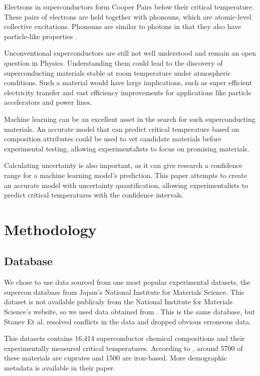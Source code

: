 \documentclass[twocolumn, nofootinbib, secnumarabic, amssymb, nobibnotes, aps, prd]{revtex4-2}
\begin{document}
Electrons in superconductors form Cooper Pairs below their critical temperature. These pairs of electrons are held together with phonouns, which are atomic-level collective excitations. Phonouns are similar to photons in that they also have particle-like properties \cite{rohlf_1994, BussmannHolderKeller2020}.

Unconventional superconductors are still not well understood and remain an open question in Physics. Understanding them could lead to the discovery of superconducting materials stable at room temperature under atmospheric conditions. Such a material would have large implications, such as super efficient electricity transfer and vast efficiency improvements for applications like particle accelerators and power lines.

Machine learning can be an excellent asset in the search for such superconducting materials. An accurate model that can predict critical temperature based on composition attributes could be used to vet candidate materials before experimental testing, allowing experimentalists to focus on promising materials. 

Calculating uncertainty is also important, as it can give research a confidence range for a machine learning model's prediction. This paper attempts to create an accurate model with uncertainty quantification, allowing experimentalists to predict critical temperatures with the confidence intervals.

\section{Methodology}
\subsection{Database}
We chose to use data sourced from one most popular experimental datasets, the supercon database from Japan's National Institute for Materials Science. This dataset is not available publicaly from the National Institute for Materials Science's website, so we used data obtained from \cite{Stanev2018}. This is the same database, but Stanev Et al. resolved conflicts in the data and dropped obvious erroneous data.

This datasets contains 16,414 superconductor chemical compositions and their experimentally measured critical temperatures. According to \cite{Stanev2018}, around 5700 of these materials are cuprates and 1500 are iron-based. More demographic metadata is available in their paper. 
\end{document}
